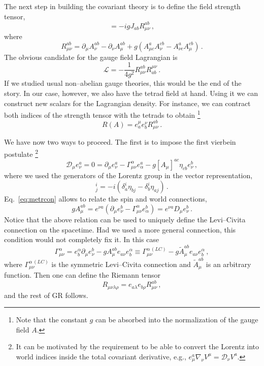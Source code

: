 \documentclass[11pt,a4paper]{article}
\newcommand{\be}{\begin{equation}}
\newcommand{\ee}{\end{equation}}
\newcommand\m{\mu}
\newcommand\D{\Delta}
\newcommand\n{\nu}
\renewcommand\r{\rho}
\renewcommand\a{\alpha}
\renewcommand\l{\lambda}
\def\d{\partial}
\renewcommand{\D}{\mathcal{D}}
\begin{document}
The next step in building the covariant theory is to define the field strength tensor,
\be
[\D_\m,\D_\n]=-i g J_{ab}R^{ab}_{\m \n}\,,
\ee
where
\be
 R^{ab}_{\m \n}=\d_\mu A_\nu^{ab}-\d_\n A_\m^{ab}+g(A_{\m c}^a A^{cb}_\n
 -A_{\n c}^a A^{cb}_\m)\,.
\ee
The obvious candidate for the gauge field Lagrangian is
\be
\mathcal{L}=-\frac{1}{4 g^2}R^{ab}_{\mu \n}R^{\m \n}_{ab} \,.
\ee
If we studied usual non--abelian gauge theories, this would be the end of the story.
In our case, however, we also have the tetrad field at hand. Using it we can construct new
scalars for the Lagrangian density. For instance, we can contract both indices of
the strength tensor with the tetrads to obtain \footnote{Note that the constant $g$ can be absorbed into the normalization of the gauge field $A$.}
\be
R(A)=e^\mu_a e^\nu_b  R_{\m \n}^{ab}\,.
\ee

We have now two ways to proceed. The first is to impose the first vierbein postulate \footnote{It can be motivated by the requirement to be able to convert the Lorentz into world indices inside the total covariant derivative, e.g., $e^a_\mu\nabla_\nu V^\mu=\mathcal{D}_\nu V^a$.}
\be
\label{eq:metrcon}
\D_\m e^a_\nu=0=
\d_\mu e^a_\nu-\Gamma_{\m \n}^\a e_\a^a -g [A_{\m}]^{ac}\eta_{cb} e^b_\n \,,
\ee
where we used the generators of the Lorentz group in the vector representation,
\be
[J_{ab}^{(V)}]^i_j=-i(\delta^i_a\eta_{bj}-\delta^i_b\eta_{aj})\,.
\ee
Eq.~\eqref{eq:metrcon} allows to relate the spin and world connections,
\be
g A_{\m}^{ab}= e^{\n a}(\d_\mu e^b_\nu-\Gamma_{\m \n}^\a e^b_\a)=
e^{\n a}D_\mu e^b_\nu \,.
\ee
Notice that the above relation can be used to uniquely define the Levi--Civita connection
on the spacetime.
Had we used a more general connection,
this condition would not completely fix it.
In this case
\be
\Gamma_{\m\n}^\a=e^{\a}_b\d_\m e^b_\n-gA_\m^{ab}e_{a\nu}e^{\a}_b \equiv
\Gamma_{\m\n}^{\a\,(LC)} -g\tilde A_\m^{ab}e_{a\nu}e^{\a}_b
\,,
\ee
where $\Gamma_{\m\n}^{\a\,(LC)}$ is the symmetric Levi--Civita connection and
 $\tilde A_\m^{ab}$ is an arbitrary function.
Then one can define the Riemann tensor
\be
R_{\m \n \l \r}=e_{a\l}e_{b\r}R^{ab}_{\m \n}\,,
\ee
and the rest of GR follows.
\end{document}
